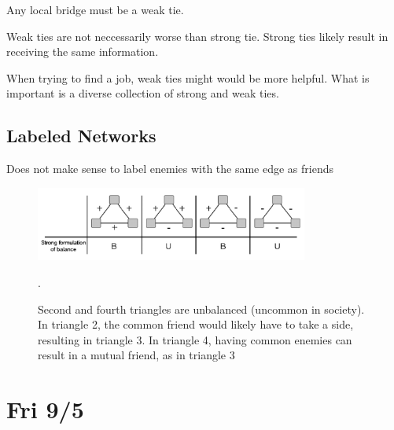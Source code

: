 \documentclass[14pt, letterpaper, oneside]{extarticle}
\begin{document}
Any local bridge must be a weak tie.

Weak ties are not neccessarily worse than strong tie. Strong ties likely result in receiving the same information.

When trying to find a job, weak ties might would be more helpful. What is important is a diverse collection of strong and weak ties.

\subsection{Labeled Networks}
Does not make sense to label enemies with the same edge as friends

\begin{figure}[H]
    \includegraphics[width=0.8\textwidth]{images/3}
    \caption{Second and fourth triangles are unbalanced (uncommon in society). In triangle 2, the common friend would likely have to take a side,
    resulting in triangle 3. In triangle 4, having common enemies can result in a mutual friend, as in triangle 3}.
\end{figure}

\section{Fri 9/5}
\end{document}
